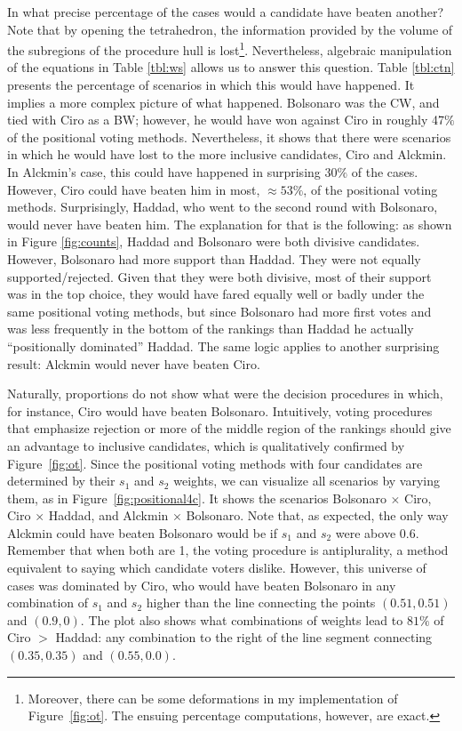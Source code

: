 \documentclass[hidelinks,11pt]{article}
\begin{document}
In what precise percentage of the cases would a candidate have beaten another?
Note that by opening the tetrahedron, the information provided by the volume of
the subregions of the procedure hull is lost\footnote{Moreover, there can be
  some deformations in my implementation of Figure~\ref{fig:ot}. The ensuing
  percentage computations, however, are exact.}. Nevertheless, algebraic
manipulation of the equations in Table \ref{tbl:ws} allows us to answer this
question. Table \ref{tbl:ctn} presents the percentage of scenarios in which this
would have happened. It implies a more complex picture of what happened.
Bolsonaro was the CW, and tied with Ciro as a BW; however, he would have won
against Ciro in roughly 47\(\%\) of the positional voting methods. Nevertheless,
it shows that there were scenarios in which he would have lost to the more
inclusive candidates, Ciro and Alckmin. In Alckmin's case, this could have
happened in surprising \(30\%\) of the cases. However, Ciro could have beaten
him in most, \(\approx 53\%\), of the positional voting methods. Surprisingly,
Haddad, who went to the second round with Bolsonaro, would never have beaten
him. The explanation for that is the following: as shown in Figure
\ref{fig:counts}, Haddad and Bolsonaro were both divisive candidates. However,
Bolsonaro had more support than Haddad. They were not equally
supported/rejected. Given that they were both divisive, most of their support
was in the top choice, they would have fared equally well or badly under the
same positional voting methods, but since Bolsonaro had more first votes and was
less frequently in the bottom of the rankings than Haddad he actually
``positionally dominated'' Haddad. The same logic applies to another surprising
result: Alckmin would never have beaten Ciro.



Naturally, proportions do not show what were the decision procedures in which,
for instance, Ciro would have beaten Bolsonaro. Intuitively, voting procedures
that emphasize rejection or more of the middle region of the rankings should
give an advantage to inclusive candidates, which is qualitatively confirmed by
Figure~\ref{fig:ot}. Since the positional voting methods with four candidates
are determined by their \(s_{1}\) and \(s_{2}\) weights, we can visualize all
scenarios by varying them, as in Figure~\ref{fig:positional4c}. It shows the
scenarios Bolsonaro \(\times\) Ciro, Ciro \(\times \) Haddad, and Alckmin
\(\times\) Bolsonaro. Note that, as expected, the only way Alckmin could have
beaten Bolsonaro would be if \(s_{1}\) and \(s_{2}\) were above 0.6. Remember
that when both are 1, the voting procedure is antiplurality, a method equivalent
to saying which candidate voters dislike. However, this universe of cases was
dominated by Ciro, who would have beaten Bolsonaro in any combination of
\(s_{1}\) and \(s_{2}\) higher than the line connecting the points
\((0.51,0.51)\) and \((0.9,0)\). The plot also shows what combinations of
weights lead to \(81\%\) of Ciro \(>\) Haddad: any combination to the right of
the line segment connecting \((0.35,0.35)\) and \((0.55,0.0)\).
\end{document}
